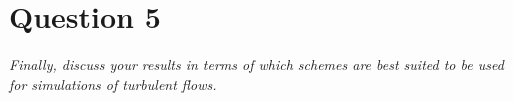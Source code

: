 \section*{Question 5}
\emph{Finally, discuss your results in terms of which schemes are best suited to be used for simulations of turbulent flows.}